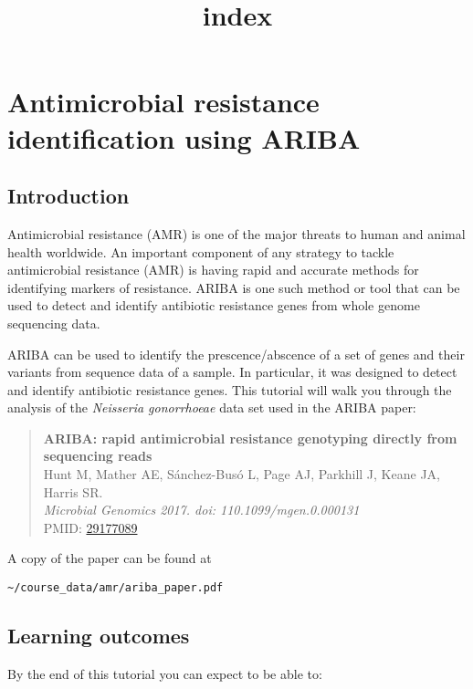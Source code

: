 \documentclass[11pt]{article}
\title{index}
\begin{document}
    \hypertarget{antimicrobial-resistance-identification-using-ariba}{%
\section{Antimicrobial resistance identification using
ARIBA}\label{antimicrobial-resistance-identification-using-ariba}}

\hypertarget{introduction}{%
\subsection{Introduction}\label{introduction}}

Antimicrobial resistance (AMR) is one of the major threats to human and
animal health worldwide. An important component of any strategy to
tackle antimicrobial resistance (AMR) is having rapid and accurate
methods for identifying markers of resistance. ARIBA is one such method
or tool that can be used to detect and identify antibiotic resistance
genes from whole genome sequencing data.

ARIBA can be used to identify the prescence/abscence of a set of genes
and their variants from sequence data of a sample. In particular, it was
designed to detect and identify antibiotic resistance genes. This
tutorial will walk you through the analysis of the \textit{Neisseria
gonorrhoeae} data set used in the ARIBA paper:

\begin{quote}
\textbf{ARIBA: rapid antimicrobial resistance genotyping directly from
sequencing reads}\\
Hunt M, Mather AE, Sánchez-Busó L, Page AJ, Parkhill J, Keane JA, Harris
SR.\\
\textit{Microbial Genomics 2017. doi: 110.1099/mgen.0.000131}\\
PMID:
\href{https://www.ncbi.nlm.nih.gov/pmc/articles/PMC5695208/}{29177089}
\end{quote}

A copy of the paper can be found at

\texttt{\textasciitilde{}/course\_data/amr/ariba\_paper.pdf}

\hypertarget{learning-outcomes}{%
\subsection{Learning outcomes}\label{learning-outcomes}}

By the end of this tutorial you can expect to be able to:
\end{document}
